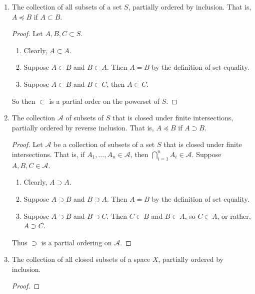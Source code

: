 \documentclass[12pt]{article}
\begin{document}
\begin{enumerate}
    \item The collection of all subsets of a set $S$, partially ordered by inclusion. That is, $A \preceq B$ if $A \subset B$.
          \begin{proof}
              Let $A, B, C \subset S$.
              \begin{enumerate}
                  \item Clearly, $A \subset A$.
                  \item Suppose $A \subset B$ and $B \subset A$. Then $A = B$ by the definition of set equality.
                  \item Suppose $A \subset B$ and $B \subset C$, then $A \subset C$.
              \end{enumerate}
              So then $\subset$ is a partial order on the powerset of $S$.
          \end{proof}

    \item The collection $\mathcal A$ of subsets of $S$ that is closed under finite intersections, partially ordered by reverse inclusion. That is, $A \preceq B$ if $A \supset B$.
          \begin{proof}
              Let $\mathcal A$ be a collection of subsets of a set $S$ that is closed under finite intersections. That is, if $A_1, \dots, A_n \in \mathcal A$, then $\bigcap_{i = 1}^n A_i \in \mathcal A$. Suppose $A, B, C \in \mathcal A$.

              \begin{enumerate}
                  \item Clearly, $A \supset A$.
                  \item Suppose $A \supset B$ and $B \supset A$. Then $A = B$ by the definition of set equality.
                  \item Suppose $A \supset B$ and $B \supset C$. Then $C \subset B$ and $B \subset A$, so $C \subset A$, or rather, $A \supset C$.
              \end{enumerate}
              Thus $\supset$ is a partial ordering on $\mathcal A$.
          \end{proof}

    \item The collection of all closed subsets of a space $X$, partially ordered by inclusion.
          \begin{proof}
          \end{proof}
\end{enumerate}
\end{document}
